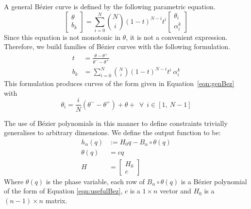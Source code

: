 A general Bézier curve is defined by the following parametric equation.
\begin{equation}
	\begin{bmatrix}
		\theta \\ b_k
	\end{bmatrix}
	=
	\sum_{i=0}^{N}\binom{N}{i}\left(1-t\right)^{N-i}t^i
	\begin{bmatrix}
		\theta_i \\ \alpha^k_i
	\end{bmatrix} \label{eqn:genBez}
\end{equation}
Since this equation is not monotonic in $\theta$, it is not a convenient expression. Therefore, we build families of Bézier curves with the following formulation.
\begin{subequations} \label{eqn:usefulBez}
\begin{align}
	t &= \frac{\theta - \theta^+}{\theta^- - \theta^+} \\
	b_k &= \sum_{i=0}^{N}\binom{N}{i}\left(1-t\right)^{N-i}t^i~\alpha^k_i
\end{align}
\end{subequations}
This formulation produces curves of the form given in Equation~\ref{eqn:genBez} with
\[\theta_i = \frac{i}{N}\left(\theta^- - \theta^+\right) + \theta+ ~~
	\forall ~~ i \in \left[1,~N-1\right]\]

The use of Bézier polynomials in this manner to define constraints trivially generalises to arbitrary dimensions. We define the output function to be:
\begin{subequations}\label{eqn:outputfun} 
\begin{align} 
	h_\alpha(q) &:= H_0 q - B_\alpha \circ \theta(q) \\
	\theta(q) &= cq \\
	H &= \begin{bmatrix}
		H_0 \\ c
	\end{bmatrix}
\end{align}
\end{subequations}
Where $\theta(q)$ is the phase variable, each row of $B_\alpha\circ\theta(q)$ is a Bézier polynomial of the form of Equation \ref{eqn:usefulBez}, $c$ is a $1\times n$ vector and $H_0$ is a $(n-1)\times n$ matrix.

